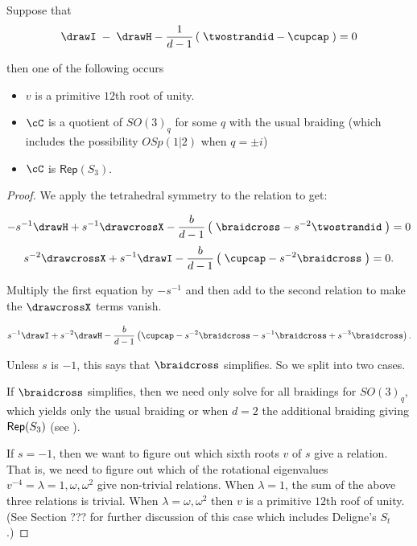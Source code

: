 \documentclass[12pt]{amsart}
\begin{document}
\begin{lemma} \label{lem:IequalsH}
Suppose that 
$$\drawI\;- \; \drawH - \frac{1}{d-1} \left(\; \twostrandid - \cupcap \;\right) = 0$$

then one of the following occurs

\begin{itemize}
\item $v$ is a primitive $12$th root of unity.

\item
$\cC$ is a quotient of $SO(3)_q$ for some $q$ with the usual braiding (which
includes the possibility $OSp(1|2)$ when $q= \pm i$)

\item
$\cC$ is  $\mathsf{Rep}(S_3)$.

\end{itemize}
\end{lemma}
\begin{proof}
We apply the tetrahedral symmetry to the relation to get:

$$-s^{-1} \drawH + s^{-1} \drawcrossX -\frac{b}{d-1} \left(\; \braidcross - s^{-2} \twostrandid \; \right) = 0$$
$$s^{-2} \drawcrossX + s^{-1} \drawI -\frac{b}{d-1} \left(\; \cupcap -s^{-2} \braidcross \; \right) = 0.$$

Multiply the first equation by $-s^{-1}$ and then add to the second relation to make the $\drawcrossX$ terms vanish.

$$s^{-1} \drawI + s^{-2} \drawH - \frac{b}{d-1} \left(\cupcap -s^{-2} \braidcross -s^{-1}\braidcross + s^{-3}\braidcross  \right).$$

Unless $s$ is $-1$, this says that $\braidcross$ simplifies.  So we split into two cases.

If $\braidcross$ simplifies, then we need only solve for all braidings for
$SO(3)_q$, which yields only the usual braiding or when $d=2$ the
additional braiding giving $\operatorname{\mathsf{Rep}}(S_3)$ (see \cite[Example 8.6]{MR3624901} ).

If $s = -1$, then we want to figure out which sixth roots $v$ of $s$ give a
relation.  That is, we need to figure out which of the rotational eigenvalues
$v^{-4} = \lambda = 1, \omega, \omega^2$ give non-trivial relations.  When
$\lambda = 1$, the sum of the above three relations is trivial.  When $\lambda
= \omega, \omega^2$ then $v$ is a primitive $12$th roof of unity.  (See
Section ??? for further discussion of this case which includes Deligne's
$S_t$.)
\end{proof}
\end{document}
